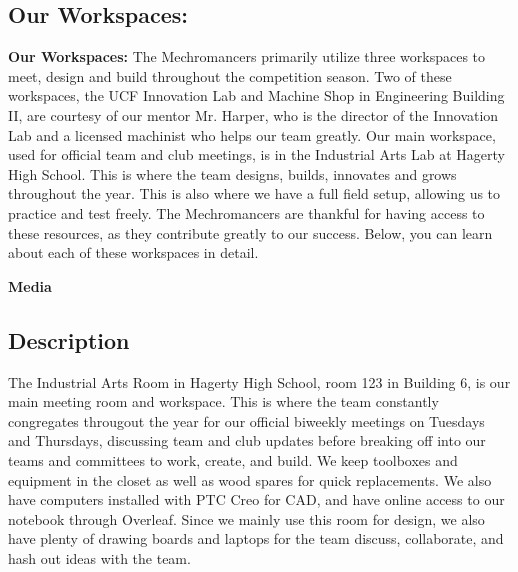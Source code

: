 \clearpage
{}
\subsection*{\textbf{\Huge Our Workspaces:}}
\vspace{.2cm}
\setlength{\parindent}{.25in} 

\textbf {\Large Our Workspaces:}
\newline
The Mechromancers primarily utilize three workspaces to meet, design and build throughout the competition season.  Two of these workspaces, the UCF Innovation Lab and Machine Shop in Engineering Building II, are courtesy of our mentor Mr. Harper, who is the director of the Innovation Lab and a licensed machinist who helps our team greatly. Our main workspace, used for official team and club meetings, is in the Industrial Arts Lab at Hagerty High School. This is where the team designs, builds, innovates and grows throughout the year. This is also where we have a full field setup, allowing us to practice and test freely. The Mechromancers are thankful for having access to these resources, as they contribute greatly to our success. Below, you can learn about each of these workspaces in detail.

\textbf {\large Media}

\subsection*{Description}
The Industrial Arts Room in Hagerty High School, room 123 in Building 6, is our main meeting room and workspace. This is where the team constantly congregates througout the year for our official biweekly meetings on Tuesdays and Thursdays, discussing team and club updates before breaking off into our teams and committees to work, create, and build. We keep toolboxes and equipment in the closet as well as wood spares for quick replacements. We also have computers installed with PTC Creo for CAD, and have online access to our notebook through Overleaf. Since we mainly use this room for design, we also have plenty of drawing boards and laptops for the team discuss, collaborate, and hash out ideas with the team. 

